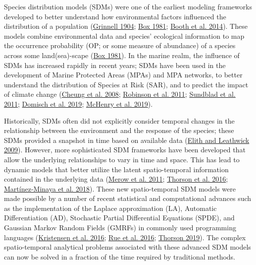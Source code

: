 \documentclass[
]{article}
\begin{document}
Species distribution models (SDMs) were one of the earliest modeling frameworks developed to better understand how environmental factors influenced the distribution of a population (\protect\hyperlink{ref-grinnellOriginDistributionChestNutBacked1904}{Grinnell 1904}; \protect\hyperlink{ref-boxPredictingPhysiognomicVegetation1981}{Box 1981}; \protect\hyperlink{ref-boothBioclimFirstSpecies2014}{Booth et al. 2014}). These models combine environmental data and species' ecological information to map the occurrence probability (OP; or some measure of abundance) of a species across some land(sea)-scape (\protect\hyperlink{ref-boxPredictingPhysiognomicVegetation1981}{Box 1981}). In the marine realm, the influence of SDMs has increased rapidly in recent years; SDMs have been used in the development of Marine Protected Areas (MPAs) and MPA networks, to better understand the distribution of Species at Risk (SAR), and to predict the impact of climate change (\protect\hyperlink{ref-cheungApplicationMacroecologicalTheory2008}{Cheung et al. 2008}; \protect\hyperlink{ref-robinsonPushingLimitsMarine2011}{Robinson et al. 2011}; \protect\hyperlink{ref-sundbladEcologicalCoherenceMarine2011}{Sundblad et al. 2011}; \protect\hyperlink{ref-domischSpatiallyExplicitSpecies2019}{Domisch et al. 2019}; \protect\hyperlink{ref-mchenryProjectingMarineSpecies2019}{McHenry et al. 2019}).

Historically, SDMs often did not explicitly consider temporal changes in the relationship between the environment and the response of the species; these SDMs provided a snapshot in time based on available data (\protect\hyperlink{ref-elithSpeciesDistributionModels2009}{Elith and Leathwick 2009}). However, more sophisticated SDM frameworks have been developed that allow the underlying relationships to vary in time and space. This has lead to dynamic models that better utilize the latent spatio-temporal information contained in the underlying data (\protect\hyperlink{ref-merowDevelopingDynamicMechanistic2011}{Merow et al. 2011}; \protect\hyperlink{ref-thorsonJointDynamicSpecies2016}{Thorson et al. 2016}; \protect\hyperlink{ref-martinez-minayaSpeciesDistributionModeling2018}{Martínez-Minaya et al. 2018}). These new spatio-temporal SDM models were made possible by a number of recent statistical and computational advances such as the implementation of the Laplace approximation (LA), Automatic Differentiation (AD), Stochastic Partial Differential Equations (SPDE), and Gaussian Markov Random Fields (GMRFs) in commonly used programming languages (\protect\hyperlink{ref-kristensenTMBAutomaticDifferentiation2016}{Kristensen et al. 2016}; \protect\hyperlink{ref-rueBayesianComputingINLA2016}{Rue et al. 2016}; \protect\hyperlink{ref-thorsonGuidanceDecisionsUsing2019}{Thorson 2019}). The complex spatio-temporal analytical problems associated with these advanced SDM models can now be solved in a fraction of the time required by traditional methods.
\end{document}
